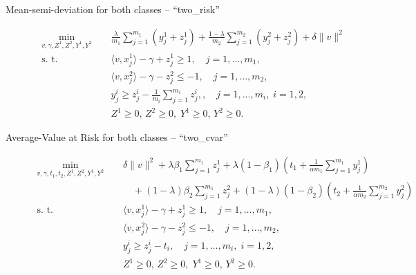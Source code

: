 \documentclass[10pt,letterpaper]{article}
\newcommand{\1}{1{\hskip -2.55 pt}\hbox{I}}
\begin{document}
\begin{description}
  \item[Mean-semi-deviation for both classes -- ``two\_risk'']
    \begin{equation}
      \label{p:RSSVM-twomsd}
      \begin{aligned}
      \min_{v,\gamma,Z^1,Z^2,Y^1,Y^2}\quad  &\,  \frac{\lambda}{m_1}\sum_{j=1}^{m_1} (y^1_j+z^1_j) + \frac{1-\lambda}{m_2}\sum_{j=1}^{m_2} (y^2_j+z^2_j) +\delta\|v\|^2 \\
      \text{s. t. }\quad  &\, \langle v, x^1_j\rangle - \gamma + z_j^1 \ge 1, \quad j=1,\dots,m_1, \\
      &\, \langle v, x^2_{j}\rangle -\gamma  - z_{j}^2 \le -1, \quad j=1,\dots,m_2, \\
      &\, y_j^i \geq z_j^i-\frac{1}{m_i}\sum_{j=1}^{m_i} z_j^i,,\quad j=1,\dots ,m_i,\; i=1,2,\\
      &\, Z^1\ge 0,\, Z^2\geq 0,\; Y^1\ge 0,\, Y^2\geq 0.
      \end{aligned}
    \end{equation}
  \item[Average-Value at Risk for both classes -- ``two\_cvar'']
    \begin{equation}
      \label{p:RSSVM-twocvar}
      \begin{aligned}
      \min_{v,\gamma,t_1,t_2,Z^1,Z^2,Y^1,Y^2}\quad  &\,  \delta\|v\|^2 + \lambda \beta_1 \sum_{j=1}^{m_1} z^1_j + \lambda(1-\beta_1)\left(t_1 + \frac{1}{\alpha m_1}\sum_{j=1}^{m_1} y^1_j\right) \\
      &\, \quad + (1-\lambda)\beta_2 \sum_{j=1}^{m_1} z^2_j +  (1-\lambda)(1-\beta_2)\left(t_2 + \frac{1}{\alpha m_2}\sum_{j=1}^{m_2} y^2_j\right)  \\
      \text{s. t. }\quad  &\, \langle v, x^1_j\rangle - \gamma + z_j^1 \ge 1, \quad j=1,\dots,m_1, \\
      &\, \langle v, x^2_{j}\rangle -\gamma  - z_{j}^2 \le -1,\quad j=1,\dots,m_2, \\
      &\, y_j^i \geq z_j^i-t_i,\quad j=1,\dots ,m_i,\; i=1,2,\\
      &\, Z^1\ge 0,\, Z^2\geq 0,\; Y^1\ge 0,\, Y^2\geq 0. 
      \end{aligned}
    \end{equation}
\end{description}



\end{document}
